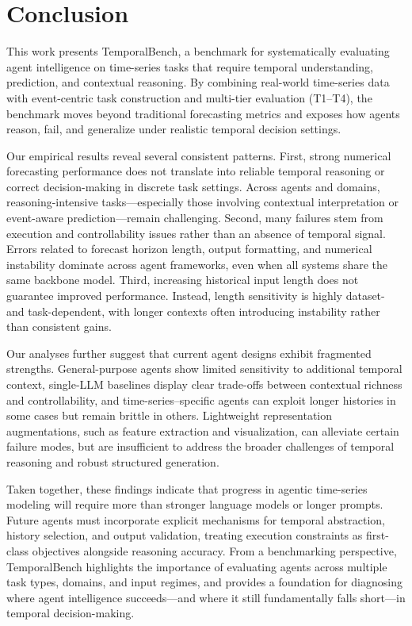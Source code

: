 \section{Conclusion}

This work presents {TemporalBench}, a benchmark for systematically evaluating agent intelligence on time-series tasks that require temporal understanding, prediction, and contextual reasoning. By combining real-world time-series data with event-centric task construction and multi-tier evaluation (T1--T4), the benchmark moves beyond traditional forecasting metrics and exposes how agents reason, fail, and generalize under realistic temporal decision settings.

Our empirical results reveal several consistent patterns. First, strong numerical forecasting performance does not translate into reliable temporal reasoning or correct decision-making in discrete task settings. Across agents and domains, reasoning-intensive tasks---especially those involving contextual interpretation or event-aware prediction---remain challenging. Second, many failures stem from execution and controllability issues rather than an absence of temporal signal. Errors related to forecast horizon length, output formatting, and numerical instability dominate across agent frameworks, even when all systems share the same backbone model. Third, increasing historical input length does not guarantee improved performance. Instead, length sensitivity is highly dataset- and task-dependent, with longer contexts often introducing instability rather than consistent gains.

Our analyses further suggest that current agent designs exhibit fragmented strengths. General-purpose agents show limited sensitivity to additional temporal context, single-LLM baselines display clear trade-offs between contextual richness and controllability, and time-series--specific agents can exploit longer histories in some cases but remain brittle in others. Lightweight representation augmentations, such as feature extraction and visualization, can alleviate certain failure modes, but are insufficient to address the broader challenges of temporal reasoning and robust structured generation.

Taken together, these findings indicate that progress in agentic time-series modeling will require more than stronger language models or longer prompts. Future agents must incorporate explicit mechanisms for temporal abstraction, history selection, and output validation, treating execution constraints as first-class objectives alongside reasoning accuracy. From a benchmarking perspective, {TemporalBench} highlights the importance of evaluating agents across multiple task types, domains, and input regimes, and provides a foundation for diagnosing where agent intelligence succeeds---and where it still fundamentally falls short---in temporal decision-making.




